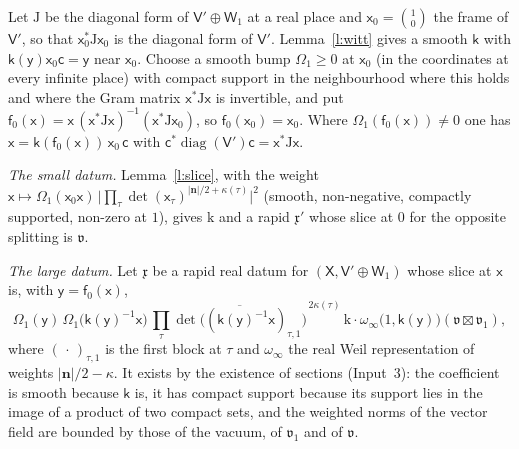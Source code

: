 \documentclass[11pt,a4paper]{article}
\makeatletter
\theoremstyle{plainx}
\theoremstyle{uprightx}
\renewenvironment{proof}[1][Proof]{\par\pushQED{\qed}\normalfont\topsep0pt\partopsep0pt
  \trivlist\item[\hskip\labelsep\itshape #1.]\ignorespaces}{\popQED\endtrivlist\@endpefalse}
\newcommand{\bn}{\mathbf{n}}
\newcommand{\sW}{\mathsf{W}}
\newcommand{\sV}{\mathsf{V}}
\newcommand{\sX}{\mathsf{X}}
\newcommand{\sk}{\mathsf{k}}
\newcommand{\sx}{\mathsf{x}}
\newcommand{\sy}{\mathsf{y}}
\newcommand{\fv}{\mathfrak{v}}
\newcommand{\fx}{\mathfrak{x}}
\makeatother
\begin{document}
\begin{proof}[Proof of Theorem 1]
Let $\mathrm{J}$ be the diagonal form of $\sV'\oplus\sW_1$ at a real place and $\sx_0=\binom10$ the frame of
$\sV'$, so that $\sx_0^{*}\mathrm{J}\sx_0$ is the diagonal form of $\sV'$. Lemma~\ref{l:witt} gives a smooth
$\sk$ with $\sk(\sy)\sx_0\mathsf{c}=\sy$ near $\sx_0$. Choose a smooth bump $\Omega_1\ge0$ at $\sx_0$ (in the
coordinates at every infinite place) with compact support in the neighbourhood where this holds and where the
Gram matrix $\sx^{*}\mathrm{J}\sx$ is invertible, and put
$\mathsf{f}_0(\sx)=\sx\,(\sx^{*}\mathrm{J}\sx)^{-1}(\sx^{*}\mathrm{J}\sx_0)$, so $\mathsf{f}_0(\sx_0)=\sx_0$. Where
$\Omega_1(\mathsf{f}_0(\sx))\ne0$ one has $\sx=\sk(\mathsf{f}_0(\sx))\,\sx_0\,\mathsf{c}$ with
$\mathsf{c}^{*}\operatorname{diag}(\sV')\mathsf{c}=\sx^{*}\mathrm{J}\sx$.

\emph{The small datum.} Lemma~\ref{l:slice}, with the weight
$\sx\mapsto\Omega_1(\sx_0\sx)\,\bigl|\prod_\tau\det(\sx_\tau)^{|\bn|/2+\kappa(\tau)}\bigr|^2$ (smooth, non-negative,
compactly supported, non-zero at $1$), gives $\mathrm{k}$ and a rapid $\fx'$ whose slice at $0$ for the opposite
splitting is $\fv$.

\emph{The large datum.} Let $\fx$ be a rapid real datum for $(\sX,\sV'\oplus\sW_1)$ whose slice at $\sx$ is,
with $\sy=\mathsf{f}_0(\sx)$,
\[\Omega_1(\sy)\,\Omega_1\bigl(\sk(\sy)^{-1}\sx\bigr)\,\prod_\tau\overline{\det\bigl((\sk(\sy)^{-1}\sx)_{\tau,1}\bigr)}^{\,2\kappa(\tau)}\,\mathrm{k}\cdot
\omega_\infty\bigl(1,\sk(\sy)\bigr)(\fv\boxtimes\fv_1),\]
where $(\,\cdot\,)_{\tau,1}$ is the first block at $\tau$ and $\omega_\infty$ the real Weil representation of weights
$|\bn|/2-\kappa$. It exists by the existence of sections (Input~3): the coefficient is smooth because $\sk$ is, it
has compact support because its support lies in the image of a product of two compact sets, and the weighted
norms of the vector field are bounded by those of the vacuum, of $\fv_1$ and of $\fv$.


\end{proof}
\end{document}
